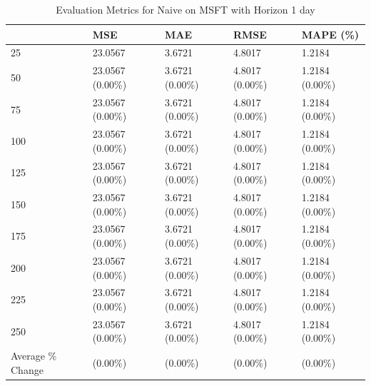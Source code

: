 \begin{table}
\caption{Evaluation Metrics for Naive on MSFT with Horizon 1 day}
\label{tab:naive_MSFT_h1_metrics}
\begin{tabular}{lllll}
\toprule
 & MSE & MAE & RMSE & MAPE (\%) \\
\midrule
25 & 23.0567 & 3.6721 & 4.8017 & 1.2184 \\
50 & 23.0567 (0.00\%) & 3.6721 (0.00\%) & 4.8017 (0.00\%) & 1.2184 (0.00\%) \\
75 & 23.0567 (0.00\%) & 3.6721 (0.00\%) & 4.8017 (0.00\%) & 1.2184 (0.00\%) \\
100 & 23.0567 (0.00\%) & 3.6721 (0.00\%) & 4.8017 (0.00\%) & 1.2184 (0.00\%) \\
125 & 23.0567 (0.00\%) & 3.6721 (0.00\%) & 4.8017 (0.00\%) & 1.2184 (0.00\%) \\
150 & 23.0567 (0.00\%) & 3.6721 (0.00\%) & 4.8017 (0.00\%) & 1.2184 (0.00\%) \\
175 & 23.0567 (0.00\%) & 3.6721 (0.00\%) & 4.8017 (0.00\%) & 1.2184 (0.00\%) \\
200 & 23.0567 (0.00\%) & 3.6721 (0.00\%) & 4.8017 (0.00\%) & 1.2184 (0.00\%) \\
225 & 23.0567 (0.00\%) & 3.6721 (0.00\%) & 4.8017 (0.00\%) & 1.2184 (0.00\%) \\
250 & 23.0567 (0.00\%) & 3.6721 (0.00\%) & 4.8017 (0.00\%) & 1.2184 (0.00\%) \\
Average \% Change & (0.00\%) & (0.00\%) & (0.00\%) & (0.00\%) \\
\bottomrule
\end{tabular}
\end{table}
